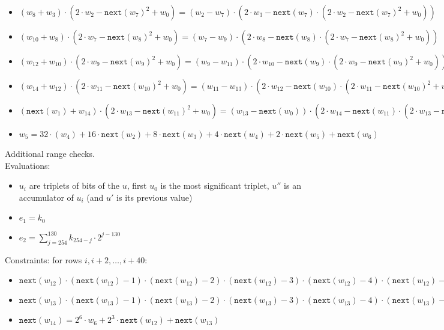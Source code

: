 \begin{itemize}
    \item $(w_{8} + w_{3}) \cdot (2 \cdot w_2 - \texttt{next}(w_7)^2 + w_{0}) = (w_2 - w_7) \cdot (2\cdot w_{3} - \texttt{next}(w_7) \cdot (2 \cdot w_2 - \texttt{next}(w_7)^2 + w_{0}))$
    \item $(w_{10} + w_{8}) \cdot (2 \cdot w_7 - \texttt{next}(w_8)^2 + w_{0}) = (w_7 - w_9) \cdot (2\cdot w_{8} - \texttt{next}(w_8) \cdot (2 \cdot w_7 - \texttt{next}(w_8)^2 + w_{0}))$
    \item $(w_{12} + w_{10}) \cdot (2 \cdot w_9 - \texttt{next}(w_9)^2 + w_{0}) = (w_9 - w_{11}) \cdot (2\cdot w_{10} - \texttt{next}(w_9) \cdot (2 \cdot w_9 - \texttt{next}(w_9)^2 + w_{0}))$
    \item $(w_{14} + w_{12}) \cdot  (2 \cdot w_{11} - \texttt{next}(w_{10})^2 + w_{0}) = (w_{11} - w_{13}) \cdot (2\cdot w_{12} - \texttt{next}(w_{10}) \cdot (2 \cdot w_{11} - \texttt{next}(w_{10})^2 + w_{0}))$
    \item $(\texttt{next}(w_{1}) + w_{14}) \cdot (2 \cdot w_{13} - \texttt{next}(w_{11})^2 + w_{0}) = (w_{13} - \texttt{next}(w_{0})) \cdot (2\cdot w_{14} - \texttt{next}(w_{11}) \cdot (2 \cdot w_{13} - \texttt{next}(w_{11})^2 + w_{0}))$ \\
    
    
    \item $w_5 = 32 \cdot (w_4) + 16 \cdot \texttt{next}(w_{2}) + 8 \cdot \texttt{next}(w_{3}) + 4 \cdot \texttt{next}(w_{4}) + 2 \cdot \texttt{next}(w_{5}) + \texttt{next}(w_{6})$
    \end{itemize}

Additional range checks.\\

Evaluations:
\begin{itemize}
    \item $u_i$ are triplets of bits of the $u$, first $u_0$ is the most significant triplet, $u''$ is an accumulator of $u_i$ (and $u'$ is its previous value)
    \item $e_1= k_0$
    \item $e_2=\sum_{j=254}^{130} k_{254-j} \cdot 2^{j-130}  $
\end{itemize}

Constraints:
for rows $i, i+2, \dots, i+40$:
\begin{itemize}
    \item $\texttt{next}(w_{12}) \cdot (\texttt{next}(w_{12}) - 1) \cdot (\texttt{next}(w_{12}) - 2) \cdot (\texttt{next}(w_{12}) - 3) \cdot (\texttt{next}(w_{12}) - 4) \cdot (\texttt{next}(w_{12}) - 5) \cdot (\texttt{next}(w_{12}) - 6) \cdot (\texttt{next}(w_{12}) - 7)= 0$
    \item $\texttt{next}(w_{13}) \cdot (\texttt{next}(w_{13}) - 1) \cdot (\texttt{next}(w_{13}) - 2) \cdot (\texttt{next}(w_{13}) - 3) \cdot (\texttt{next}(w_{13}) - 4) \cdot (\texttt{next}(w_{13}) - 5) \cdot (\texttt{next}(w_{13}) - 6) \cdot (\texttt{next}(w_{13}) - 7)= 0$
    \item $\texttt{next}(w_{14}) = 2^6\cdot w_6 + 2^3 \cdot \texttt{next}(w_{12}) + \texttt{next}(w_{13})$
\end{itemize}

